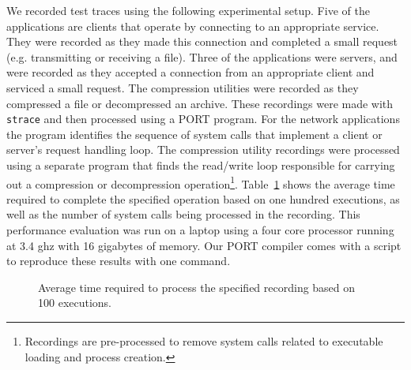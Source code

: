 We recorded test traces using the following
experimental setup. Five of the applications are clients that operate by connecting to an appropriate service. They were recorded as they made this connection and completed a small request (e.g. transmitting or receiving a file).
Three of the applications were servers, and were recorded as they accepted a connection from an appropriate client and serviced a small request.
The compression utilities were recorded as they compressed a file or decompressed an archive.
These recordings were made with {\tt strace}
and then processed using a PORT program.
For the network applications the program
identifies the sequence of system calls that implement
a client or server's request handling loop.
The compression utility recordings were processed using a separate
program that finds the read/write loop responsible for
carrying out a compression or decompression operation\footnote{Recordings are pre-processed to remove system calls
related to executable loading and process creation.}.  Table~\ref{tbl:RealWorldPerformance}
shows the average time required to complete the specified operation
based on one hundred executions, as well as the number of system calls being processed in the recording.  This performance evaluation was run on a laptop using a four core processor running at 3.4 ghz with 16 gigabytes of memory.
Our PORT compiler comes with a script to reproduce these results with one command.

\begin{figure}[t]
\centering
\small
{}
\caption{Average time required to process the specified recording based on 100 executions.}
\label{tbl:RealWorldPerformance}
\end{figure}


